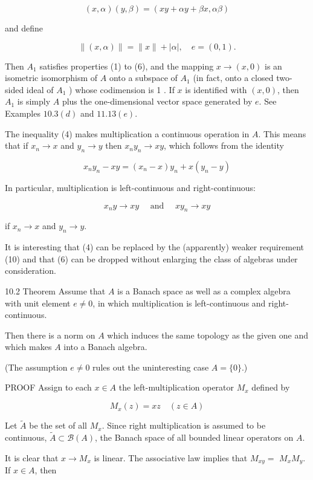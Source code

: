 \documentclass[10pt]{article}
\begin{document}
$$
(x, \alpha)(y, \beta)=(x y+\alpha y+\beta x, \alpha \beta)
$$

and define

$$
\|(x, \alpha)\|=\|x\|+|\alpha|, \quad e=(0,1) .
$$

Then $A_{1}$ satisfies properties (1) to (6), and the mapping $x \rightarrow(x, 0)$ is an isometric isomorphism of $A$ onto a subspace of $A_{1}$ (in fact, onto a closed two-sided ideal of $A_{1}$ ) whose codimension is 1 . If $x$ is identified with $(x, 0)$, then $A_{1}$ is simply $A$ plus the one-dimensional vector space generated by $e$. See Examples $10.3(d)$ and $11.13(e)$.

The inequality (4) makes multiplication a continuous operation in $A$. This means that if $x_{n} \rightarrow x$ and $y_{n} \rightarrow y$ then $x_{n} y_{n} \rightarrow x y$, which follows from the identity

$$
x_{n} y_{n}-x y=\left(x_{n}-x\right) y_{n}+x\left(y_{n}-y\right)
$$

In particular, multiplication is left-continuous and right-continuous:

$$
x_{n} y \rightarrow x y \quad \text { and } \quad x y_{n} \rightarrow x y
$$

if $x_{n} \rightarrow x$ and $y_{n} \rightarrow y$.

It is interesting that (4) can be replaced by the (apparently) weaker requirement (10) and that (6) can be dropped without enlarging the class of algebras under consideration.

10.2 Theorem Assume that $A$ is a Banach space as well as a complex algebra with unit element $e \neq 0$, in which multiplication is left-continuous and right-continuous.

Then there is a norm on $A$ which induces the same topology as the given one and which makes $A$ into a Banach algebra.

(The assumption $e \neq 0$ rules out the uninteresting case $A=\{0\}$.)

PROOF Assign to each $x \in A$ the left-multiplication operator $M_{x}$ defined by

$$
M_{x}(z)=x z \quad(z \in A)
$$

Let $\tilde{A}$ be the set of all $M_{x}$. Since right multiplication is assumed to be continuous, $\tilde{A} \subset \mathscr{B}(A)$, the Banach space of all bounded linear operators on $A$.

It is clear that $x \rightarrow M_{x}$ is linear. The associative law implies that $M_{x y}=$ $M_{x} M_{y}$. If $x \in A$, then
\end{document}
